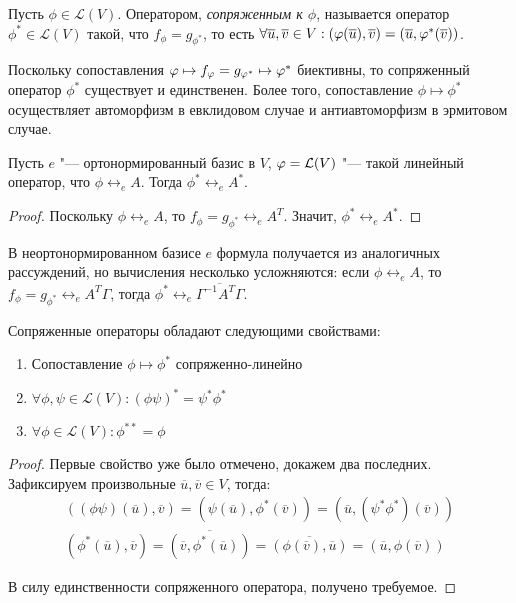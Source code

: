 \begin{definition}
	Пусть $\phi \in \mathcal{L}(V)$. Оператором, \textit{сопряженным к $\phi$}, называется оператор $\phi^* \in \mathcal{L}(V)$ такой, что $f_\phi = g_{\phi^*}$, то есть $\forall \overline{u}, \overline{v} \in V: (\phi(\overline{u}), \overline{v}) \hm{=} (\overline{u}, \phi^*(\overline{v}))$.
\end{definition}

\begin{note}
	Поскольку сопоставления $\phi \mapsto f_\phi = g_{\phi^*} \hm{\mapsto} \phi^*$ биективны, то сопряженный оператор $\phi^*$ существует и единственен. Более того, сопоставление $\phi \mapsto \phi^*$ осуществляет автоморфизм в евклидовом случае и антиавтоморфизм в эрмитовом случае.
\end{note}

\begin{proposition}
	Пусть $e$ "--- ортонормированный базис в $V$, $\phi \hm{=} \mathcal{L}(V)$ "--- такой линейный оператор, что $\phi \leftrightarrow_e A$. Тогда $\phi^* \leftrightarrow_e A^*$.
\end{proposition}

\begin{proof}
	Поскольку $\phi \leftrightarrow_e A$, то $f_\phi = g_{\phi^*} \leftrightarrow_e A^T$. Значит, $\phi^* \leftrightarrow_e A^*$.
\end{proof}

\begin{note}
	В неортонормированном базисе $e$ формула получается из аналогичных рассуждений, но вычисления несколько усложняются: если $\phi \leftrightarrow_e A$, то $f_\phi = g_{\phi^*} \leftrightarrow_e A^T\Gamma$, тогда $\phi^* \leftrightarrow_e \overline{\Gamma^{-1}A^T\Gamma}$.
\end{note}

\begin{proposition} Сопряженные операторы обладают следующими свойствами:
	\begin{enumerate}
		\item Сопоставление $\phi \mapsto \phi^*$ сопряженно-линейно
		\item $\forall \phi, \psi \in \mathcal{L}(V): (\phi\psi)^* = \psi^*\phi^*$
		\item $\forall \phi \in \mathcal{L}(V): \phi^{**} = \phi$
	\end{enumerate}
\end{proposition}

\begin{proof}
	Первые свойство уже было отмечено, докажем два последних. Зафиксируем произвольные $\overline{u}, \overline{v} \in V$, тогда:
	\begin{gather*}
		((\phi\psi)(\overline{u}), \overline{v}) = (\psi(\overline{u}), \phi^*(\overline{v})) = (\overline{u}, (\psi^*\phi^*)(\overline{v}))\\
		(\phi^*(\overline{u}), \overline{v}) = \overline{(\overline{v}, \phi^*(\overline{u}))} = \overline{(\phi(\overline{v}), \overline{u})} = (\overline{u}, \phi(\overline{v}))
	\end{gather*}
	
	В силу единственности сопряженного оператора, получено требуемое.
\end{proof}

